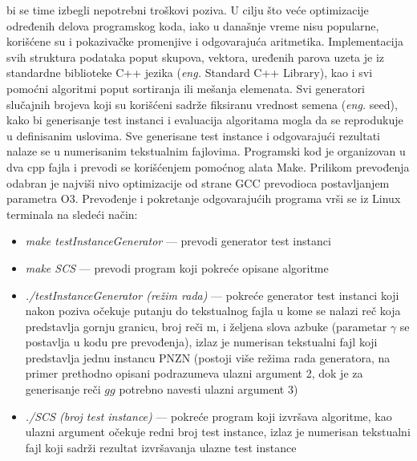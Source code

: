 \documentclass[12pt,oneside]{memoir}
\begin{document}
bi se time izbegli nepotrebni troškovi poziva. U cilju što veće optimizacije
određenih delova programskog koda, iako u današnje vreme nisu popularne,
korišćene su i pokazivačke promenjive i odgovarajuća aritmetika. 
Implementacija svih struktura podataka poput skupova, vektora, uređenih parova
uzeta je iz standardne biblioteke C++ jezika (\textit{eng.} Standard C++ Library), kao i svi
pomoćni algoritmi poput sortiranja ili mešanja elemenata.
Svi generatori slučajnih brojeva koji su korišćeni sadrže fiksiranu
vrednost semena (\textit{eng.} seed), kako bi generisanje test instanci
i evaluacija algoritama mogla da se reprodukuje u definisanim uslovima.
Sve generisane test instance i odgovarajući rezultati nalaze se u numerisanim tekstualnim fajlovima.
Programski kod je organizovan u dva cpp fajla i prevodi se korišćenjem
pomoćnog alata Make. Prilikom prevođenja odabran je najviši nivo
optimizacije od strane GCC prevodioca postavljanjem parametra O3.
Prevođenje i pokretanje odgovarajućih programa vrši se
iz Linux terminala na sledeći način:
\begin{itemize}
  \item \textit{make testInstanceGenerator} — prevodi generator test instanci
  \item \textit{make SCS} — prevodi program koji pokreće opisane algoritme
  \item \textit{./testInstanceGenerator (režim rada)} — pokreće generator test instanci koji nakon poziva 
  očekuje putanju do tekstualnog fajla u kome se nalazi reč koja predstavlja gornju granicu,
  broj reči m, i željena slova azbuke (parametar $\gamma$ se postavlja u kodu pre prevođenja),
  izlaz je numerisan tekstualni fajl koji predstavlja jednu instancu PNZN (postoji više 
  režima rada generatora, na primer prethodno opisani podrazumeva ulazni argument 2, dok je za generisanje
  reči $gg$ potrebno navesti ulazni argument 3)
  \item \textit{./SCS (broj test instance)} — pokreće program koji izvršava algoritme,
  kao ulazni argument očekuje redni broj test instance, izlaz je numerisan tekstualni fajl
  koji sadrži rezultat izvršavanja ulazne test instance
\end{itemize}
\end{document}
